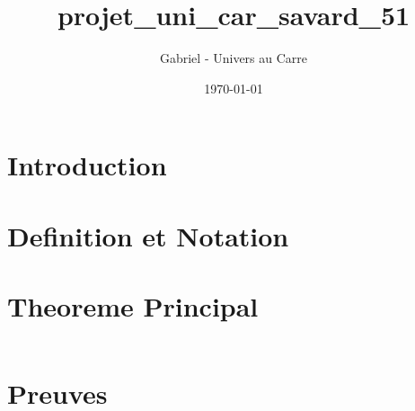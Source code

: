 \documentclass[12pt]{article}
\title{projet_uni_car_savard_51}
\author{Gabriel - Univers au Carre}
\date{\today}
\begin{document}
\maketitle


\section{Introduction}



\section{Definition et Notation}



\section{Theoreme Principal}


\begin{equation}
\end{equation}


\section{Preuves}


\end{document}
